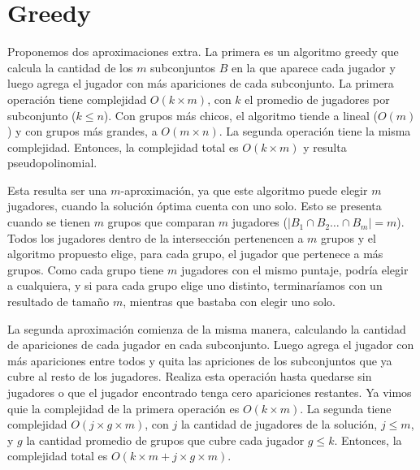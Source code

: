 \section{Greedy}

Proponemos dos aproximaciones extra. La primera es un algoritmo greedy que calcula la cantidad de los $m$ subconjuntos $B$ en la que aparece cada jugador y luego agrega el jugador con más apariciones de cada subconjunto. La primera operación tiene complejidad $O(k \times m)$, con $k$ el promedio de jugadores por subconjunto ($k \leq n$). Con grupos más chicos, el algoritmo tiende a lineal ($O(m)$) y con grupos más grandes, a $O(m\times n)$. La segunda operación tiene la misma complejidad. Entonces, la complejidad total es $O(k \times m)$ y resulta pseudopolinomial.

Esta resulta ser una $m$-aproximación, ya que este algoritmo puede elegir $m$ jugadores, cuando la solución óptima cuenta con uno solo. Esto se presenta cuando se tienen $m$ grupos que comparan $m$ jugadores ($\left|B_1 \cap B_2 \dots \cap B_m\right| = m$). Todos los jugadores dentro de la intersección pertenencen a $m$ grupos y el algoritmo propuesto elige, para cada grupo, el jugador que pertenece a más grupos. Como cada grupo tiene $m$ jugadores con el mismo puntaje, podría elegir a cualquiera, y si para cada grupo elige uno distinto, terminaríamos con un resultado de tamaño $m$, mientras que bastaba con elegir uno solo.

La segunda aproximación comienza de la misma manera, calculando la cantidad de apariciones de cada jugador en cada subconjunto. Luego agrega el jugador con más apariciones entre todos y quita las apriciones de los subconjuntos que ya cubre al resto de los jugadores. Realiza esta operación hasta quedarse sin jugadores o que el jugador encontrado tenga cero apariciones restantes. Ya vimos quie la complejidad de la primera operación es $O(k \times m)$. La segunda tiene complejidad $O(j \times g \times m)$, con $j$ la cantidad de jugadores de la solución, $j \leq m$, y $g$ la cantidad promedio de grupos que cubre cada jugador $g \leq k$. Entonces, la complejidad total es $O(k \times m + j \times g \times m)$. %

    